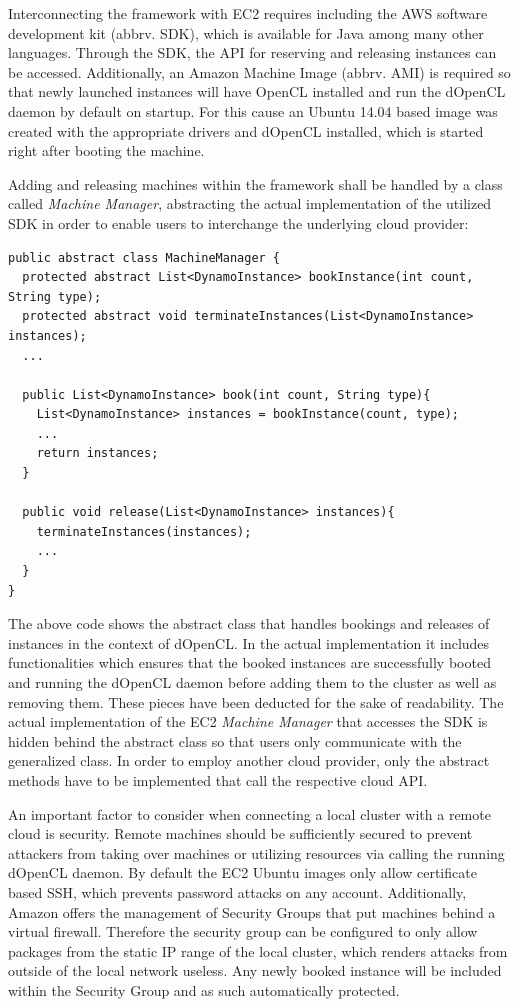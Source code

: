 Interconnecting the framework with EC2 requires including the AWS software development kit (abbrv. SDK), which is available for Java among many other languages. Through the SDK, the API for reserving and releasing instances can be accessed. Additionally, an Amazon Machine Image (abbrv. AMI) is required so that newly launched instances will have OpenCL installed and run the dOpenCL daemon by default on startup. For this cause an Ubuntu 14.04 based image was created with the appropriate drivers and dOpenCL installed, which is started right after booting the machine.

Adding and releasing machines within the framework shall be handled by a class called \textit{Machine Manager}, abstracting the actual implementation of the utilized SDK in order to enable users to interchange the underlying cloud provider:


\begin{lstlisting}
public abstract class MachineManager {
  protected abstract List<DynamoInstance> bookInstance(int count, String type);
  protected abstract void terminateInstances(List<DynamoInstance> instances);
  ...

  public List<DynamoInstance> book(int count, String type){
    List<DynamoInstance> instances = bookInstance(count, type);
    ...
    return instances;
  }

  public void release(List<DynamoInstance> instances){
    terminateInstances(instances);
    ...
  }
}
\end{lstlisting}

The above code shows the abstract class that handles bookings and releases of instances in the context of dOpenCL. In the actual implementation it includes functionalities which ensures that the booked instances are successfully booted and running the dOpenCL daemon before adding them to the cluster as well as removing them. These pieces have been deducted for the sake of readability. The actual implementation of the EC2 \textit{Machine Manager} that accesses the SDK is hidden behind the abstract class so that users only communicate with the generalized class. In order to employ another cloud provider, only the abstract methods have to be implemented that call the respective cloud API.

An important factor to consider when connecting a local cluster with a remote cloud is security. Remote machines should be sufficiently secured to prevent attackers from taking over machines or utilizing resources via calling the running dOpenCL daemon. By default the EC2 Ubuntu images only allow certificate based SSH, which prevents password attacks on any account. Additionally, Amazon offers the management of Security Groups that put machines behind a virtual firewall. Therefore the security group can be configured to only allow packages from the static IP range of the local cluster, which renders attacks from outside of the local network useless. Any newly booked instance will be included within the Security Group and as such automatically protected.

